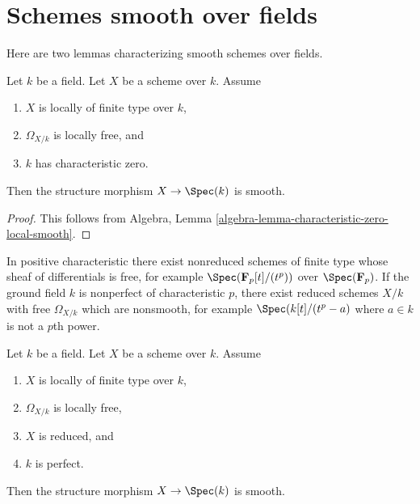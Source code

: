 \section{Schemes smooth over fields}
\label{section-smooth}

\noindent
Here are two lemmas characterizing smooth schemes over fields.

\begin{lemma}
\label{lemma-char-zero-differentials-free-smooth}
Let $k$ be a field. Let $X$ be a scheme over $k$.
Assume
\begin{enumerate}
\item $X$ is locally of finite type over $k$,
\item $\Omega_{X/k}$ is locally free, and
\item $k$ has characteristic zero.
\end{enumerate}
Then the structure morphism $X \to \Spec(k)$ is smooth.
\end{lemma}

\begin{proof}
This follows from
Algebra, Lemma \ref{algebra-lemma-characteristic-zero-local-smooth}.
\end{proof}

\noindent
In positive characteristic there exist nonreduced schemes
of finite type whose sheaf of differentials is free, for example
$\Spec(\mathbf{F}_p[t]/(t^p))$ over $\Spec(\mathbf{F}_p)$.
If the ground field $k$ is nonperfect of characteristic $p$,
there exist reduced schemes $X/k$ with free $\Omega_{X/k}$ which are
nonsmooth, for example $\Spec(k[t]/(t^p-a)$ where $a \in k$
is not a $p$th power.

\begin{lemma}
\label{lemma-char-p-differentials-free-smooth}
Let $k$ be a field. Let $X$ be a scheme over $k$.
Assume
\begin{enumerate}
\item $X$ is locally of finite type over $k$,
\item $\Omega_{X/k}$ is locally free,
\item $X$ is reduced, and
\item $k$ is perfect.
\end{enumerate}
Then the structure morphism $X \to \Spec(k)$ is smooth.
\end{lemma}

